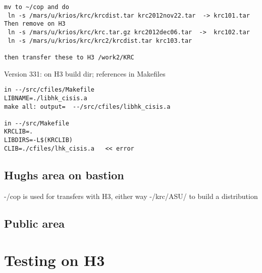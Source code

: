 \documentclass{article}
\begin{document}
\begin{verbatim}
mv to ~/cop and do 
 ln -s /mars/u/krios/krc/krcdist.tar krc2012nov22.tar  -> krc101.tar Then remove on H3
 ln -s /mars/u/krios/krc/krc.tar.gz krc2012dec06.tar  ->  krc102.tar
 ln -s /mars/u/krios/krc/krc2/krcdist.tar krc103.tar

then transfer these to H3 /work2/KRC

\end{verbatim}

Version 331: on H3 build dir; references in Makefiles
\vspace{-3.mm} 
\begin{verbatim}
in --/src/cfiles/Makefile 
LIBNAME=./libhk_cisis.a
make all: output=  --/src/cfiles/libhk_cisis.a

in --/src/Makefile
KRCLIB=.
LIBDIRS=-L$(KRCLIB)
CLIB=./cfiles/lhk_cisis.a   << error
\end{verbatim}

\subsection{Hughs area on bastion}
-/cop is used for transfers with H3, either way
-/krc/ASU/ to build a distribution

\subsection{Public area}

\section{Testing on H3}
\end{document}
